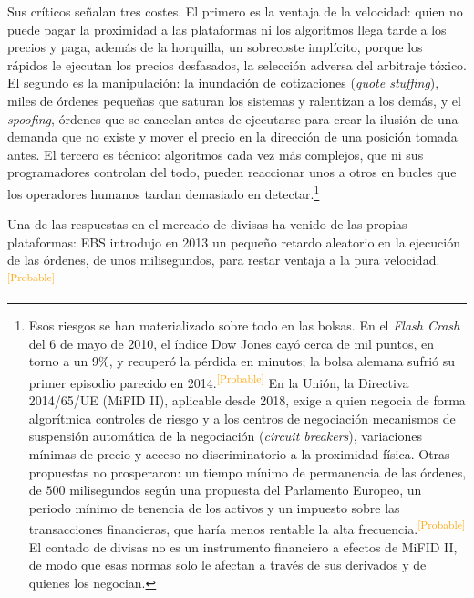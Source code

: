 \documentclass[10pt,a4paper]{article}
\begin{document}
Sus críticos señalan tres costes. El primero es la ventaja de la velocidad: quien no puede pagar la proximidad a las plataformas ni los algoritmos llega tarde a los precios y paga, además de la horquilla, un sobrecoste implícito, porque los rápidos le ejecutan los precios desfasados, la selección adversa del arbitraje tóxico. El segundo es la manipulación: la inundación de cotizaciones (\textit{quote stuffing}), miles de órdenes pequeñas que saturan los sistemas y ralentizan a los demás, y el \textit{spoofing}, órdenes que se cancelan antes de ejecutarse para crear la ilusión de una demanda que no existe y mover el precio en la dirección de una posición tomada antes. El tercero es técnico: algoritmos cada vez más complejos, que ni sus programadores controlan del todo, pueden reaccionar unos a otros en bucles que los operadores humanos tardan demasiado en detectar.\footnote{%
    Esos riesgos se han materializado sobre todo en las bolsas. En el \textit{Flash Crash} del 6 de mayo de 2010, el índice Dow Jones cayó cerca de mil puntos, en torno a un $9\%$, y recuperó la pérdida en minutos; la bolsa alemana sufrió su primer episodio parecido en 2014.\textcolor{orange}{\textsuperscript{[Probable]}} En la Unión, la Directiva 2014/65/UE (MiFID II), aplicable desde 2018, exige a quien negocia de forma algorítmica controles de riesgo y a los centros de negociación mecanismos de suspensión automática de la negociación (\textit{circuit breakers}), variaciones mínimas de precio y acceso no discriminatorio a la proximidad física. Otras propuestas no prosperaron: un tiempo mínimo de permanencia de las órdenes, de $500$ milisegundos según una propuesta del Parlamento Europeo, un periodo mínimo de tenencia de los activos y un impuesto sobre las transacciones financieras, que haría menos rentable la alta frecuencia.\textcolor{orange}{\textsuperscript{[Probable]}} El contado de divisas no es un instrumento financiero a efectos de MiFID II, de modo que esas normas solo le afectan a través de sus derivados y de quienes los negocian.
}

Una de las respuestas en el mercado de divisas ha venido de las propias plataformas: EBS introdujo en 2013 un pequeño retardo aleatorio en la ejecución de las órdenes, de unos milisegundos, para restar ventaja a la pura velocidad.\textcolor{orange}{\textsuperscript{[Probable]}}
\end{document}
